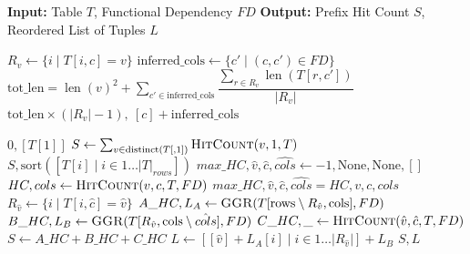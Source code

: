 \documentclass[manuscript,review]{acmart}
\begin{document}
\begin{algorithm}[h]
\caption{Greedy Group Recursion (GGR)}
\begin{algorithmic}[1]
\State \textbf{Input:} Table $T$, Functional Dependency $FD$
\State \textbf{Output:} Prefix Hit Count $S$, Reordered List of Tuples $L$

    \State $R_v \gets \{i \mid T[i,c] = v\}$
    \State $\text{inferred\_cols} \gets \{c' \mid (c,c') \in FD\}$
    \State $\text{tot\_len} = \operatorname{len}(v)^2 + \sum_{c' \in \text{inferred\_cols}} \dfrac{\sum_{r \in R_v} \operatorname{len}(T[r,c'])}{|R_v|}$
    \State \Return $\text{tot\_len} \times (|R_v| - 1),\ [c] + \text{inferred\_cols}$
\EndFunction

\Statex

        \State \Return $0, [T[1]]$
    \EndIf
        \State $S \gets \sum_{v \in \text{distinct}(T[,1])} \Call{HitCount}{v, 1, T}$
        \State \Return $S, \text{sort}([T[i] \mid i \in 1 \ldots |T|_{rows}])$
    \EndIf
    \State $max\_HC, \hat{v}, \hat{c}, \hat{cols} \gets -1, \text{None}, \text{None}, []$
        \State $HC, cols \gets \Call{HitCount}{v, c, T, FD}$
            \State $max\_HC, \hat{v}, \hat{c}, \hat{cols} = HC, v, c, cols$
        \EndIf
    \EndFor
    \State $R_{\hat{v}} \gets \{i \mid T[i, \hat{c}] = \hat{v}\}$
    \State $A\_HC, L_A \gets \Call{GGR}{T[\text{rows} \setminus R_{\hat{v}}, \text{cols}], FD}$
    \State $B\_HC, L_B \gets \Call{GGR}{T[R_{\hat{v}}, \text{cols} \setminus \hat{cols}], FD}$
    \State $C\_HC, \_ \gets \Call{HitCount}{\hat{v}, \hat{c}, T, FD}$
    \State $S \gets A\_HC + B\_HC + C\_HC$
    \State $L \gets [[\hat{v}] + L_A[i] \mid i \in 1 \ldots |R_{\hat{v}}|] + L_B$
    \State \Return $S, L$
\EndFunction

\Statex

\State \Return {}
\end{algorithmic}
\end{algorithm}
\end{document}
